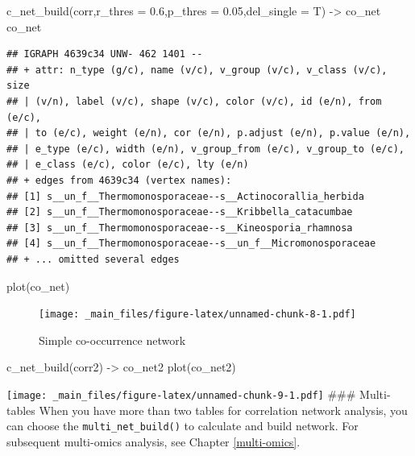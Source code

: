 \documentclass[
]{book}
\newenvironment{Shaded}{\begin{snugshade}}{\end{snugshade}}
\newcommand{\AttributeTok}[1]{\textcolor[rgb]{0.77,0.63,0.00}{#1}}
\newcommand{\FloatTok}[1]{\textcolor[rgb]{0.00,0.00,0.81}{#1}}
\newcommand{\FunctionTok}[1]{\textcolor[rgb]{0.00,0.00,0.00}{#1}}
\newcommand{\NormalTok}[1]{#1}
\newcommand{\OtherTok}[1]{\textcolor[rgb]{0.56,0.35,0.01}{#1}}
\begin{document}
\begin{Shaded}
\begin{Highlighting}[]
\FunctionTok{c\_net\_build}\NormalTok{(corr,}\AttributeTok{r\_thres =} \FloatTok{0.6}\NormalTok{,}\AttributeTok{p\_thres =} \FloatTok{0.05}\NormalTok{,}\AttributeTok{del\_single =}\NormalTok{ T) }\OtherTok{{-}\textgreater{}}\NormalTok{ co\_net}
\NormalTok{co\_net}
\end{Highlighting}
\end{Shaded}

\begin{verbatim}
## IGRAPH 4639c34 UNW- 462 1401 -- 
## + attr: n_type (g/c), name (v/c), v_group (v/c), v_class (v/c), size
## | (v/n), label (v/c), shape (v/c), color (v/c), id (e/n), from (e/c),
## | to (e/c), weight (e/n), cor (e/n), p.adjust (e/n), p.value (e/n),
## | e_type (e/c), width (e/n), v_group_from (e/c), v_group_to (e/c),
## | e_class (e/c), color (e/c), lty (e/n)
## + edges from 4639c34 (vertex names):
## [1] s__un_f__Thermomonosporaceae--s__Actinocorallia_herbida    
## [2] s__un_f__Thermomonosporaceae--s__Kribbella_catacumbae      
## [3] s__un_f__Thermomonosporaceae--s__Kineosporia_rhamnosa      
## [4] s__un_f__Thermomonosporaceae--s__un_f__Micromonosporaceae  
## + ... omitted several edges
\end{verbatim}

\begin{Shaded}
\begin{Highlighting}[]
\FunctionTok{plot}\NormalTok{(co\_net)}
\end{Highlighting}
\end{Shaded}

\begin{figure}
\centering
\texttt{[image: \_main\_files/figure-latex/unnamed-chunk-8-1.pdf]}
\caption{\label{fig:unnamed-chunk-8}Simple co-occurrence network}
\end{figure}

\begin{Shaded}
\begin{Highlighting}[]
\FunctionTok{c\_net\_build}\NormalTok{(corr2) }\OtherTok{{-}\textgreater{}}\NormalTok{ co\_net2}
\FunctionTok{plot}\NormalTok{(co\_net2)}
\end{Highlighting}
\end{Shaded}

\texttt{[image: \_main\_files/figure-latex/unnamed-chunk-9-1.pdf]}
\#\#\# Multi-tables
When you have more than two tables for correlation network analysis, you can choose the \texttt{multi\_net\_build()} to calculate and build network. For subsequent multi-omics analysis, see Chapter \ref{multi-omics}.
\end{document}
